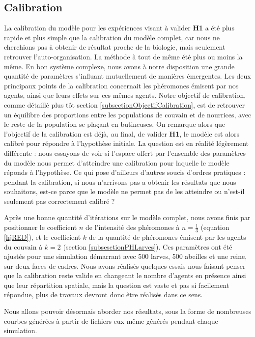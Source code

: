		\subsection{Calibration}
		La calibration du modèle pour les expériences visant à valider \textbf{H1} a été plus rapide et plus simple que la calibration du modèle complet, car nous ne cherchions pas à obtenir de résultat proche de la biologie, mais seulement retrouver l'auto-organisation. La méthode à tout de même été plus ou moins la même. En bon système complexe, nous avons à notre disposition une grande quantité de paramètres s'influant mutuellement de manières émergentes. Les deux principaux points de la calibration concernait les phéromones émisent par nos agents, ainsi que leurs effets sur ces mêmes agents. Notre objectif de calibration, comme détaillé plus tôt section \ref{subsectionObjectifCalibration}, est de retrouver un équilibre des proportions entre les populations de couvain et de nourrices, avec le reste de la population se plaçant en butineuses. On remarque alors que l'objectif de la calibration est déjà, au final, de valider \textbf{H1}, le modèle est alors calibré pour répondre à l'hypothèse initiale. La question est en réalité légèrement différente : nous essayons de voir si l'espace offert par l'ensemble des paramètres du modèle nous permet d'atteindre une calibration pour laquelle le modèle réponds à l'hypothèse. Ce qui pose d'ailleurs d'autres soucis d'ordres pratiques : pendant la calibration, si nous n'arrivons pas a obtenir les résultats que nous souhaitons, est-ce parce que le modèle ne permet pas de les atteindre ou n'est-il seulement pas correctement calibré ?
		
		Après une bonne quantité d'itérations sur le modèle complet, nous avons finis par positionner le coefficient $n$ de l'intensité des phéromones à $n = \frac{1}{3}$ (equation \ref{hjRED}), et le coefficient $k$ de la quantité de phéromones émisent par les agents du couvain à $k=2$ (section \ref{subsesctionPHLarves}). Ces paramètres ont été ajustés pour une simulation démarrant avec 500 larves, 500 abeilles et une reine, sur deux faces de cadres. Nous avons réalisés quelques essais nous faisant penser que la calibration reste valide en changeant le nombre d'agents en présence ainsi que leur répartition spatiale, mais la question est vaste et pas si facilement répondue, plus de travaux devront donc être réalisés dans ce sens.
		
		Nous allons pouvoir désormais aborder nos résultats, sous la forme de nombreuses courbes générées à partir de fichiers eux même générés pendant chaque simulation. 
		
